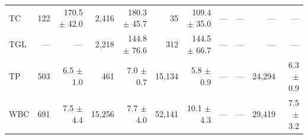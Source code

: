 \begin{table}[ht]
\begin{tabular}{lrrrrrrrrrr}
TC & 122 & 170.5 $\pm$ 42.0 & 2,416 & 180.3 $\pm$ 45.7 & 35 & 109.4 $\pm$ 35.0 & --- & --- & --- & --- \\
TGL & --- & --- & 2,218 & 144.8 $\pm$ 76.6 & 312 & 144.5 $\pm$ 66.7 & --- & --- & --- & --- \\
TP & 503 & 6.5 $\pm$ 1.0 & 461 & 7.0 $\pm$ 0.7 & 15,134 & 5.8 $\pm$ 0.9 & --- & --- & 24,294 & 6.3 $\pm$ 0.9 \\
WBC & 691 & 7.5 $\pm$ 4.4 & 15,256 & 7.7 $\pm$ 4.0 & 52,141 & 10.1 $\pm$ 4.3 & --- & --- & 29,419 & 7.5 $\pm$ 3.2 \\
\bottomrule
\end{tabular}
\label{tab:03_cohort_index}
\end{table}